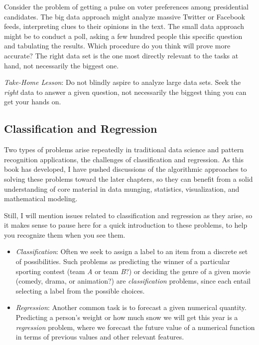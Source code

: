 \documentclass[10pt]{article}
\begin{document}
Consider the problem of getting a pulse on voter preferences among presidential candidates. The big data approach might analyze massive Twitter or Facebook feeds, interpreting clues to their opinions in the text. The small data approach might be to conduct a poll, asking a few hundred people this specific question and tabulating the results. Which procedure do you think will prove more accurate? The right data set is the one most directly relevant to the tasks at hand, not necessarily the biggest one.

\textit{Take-Home Lesson}: Do not blindly aspire to analyze large data sets. Seek the \textit{right} data to answer a given question, not necessarily the biggest thing you can get your hands on.

\subsection{Classification and Regression}
Two types of problems arise repeatedly in traditional data science and pattern recognition applications, the challenges of classification and regression. As this book has developed, I have pushed discussions of the algorithmic approaches to solving these problems toward the later chapters, so they can benefit from a solid understanding of core material in data munging, statistics, visualization, and mathematical modeling.

Still, I will mention issues related to classification and regression as they arise, so it makes sense to pause here for a quick introduction to these problems, to help you recognize them when you see them.

\begin{itemize}
  \item \textit{Classification}: Often we seek to assign a label to an item from a discrete set of possibilities. Such problems as predicting the winner of a particular sporting contest (team \textit{A} or team \textit{B}?) or deciding the genre of a given movie (comedy, drama, or animation?) are \textit{classification} problems, since each entail selecting a label from the possible choices.
  \item \textit{Regression}: Another common task is to forecast a given numerical quantity. Predicting a person's weight or how much snow we will get this year is a \textit{regression} problem, where we forecast the future value of a numerical function in terms of previous values and other relevant features.
\end{itemize}
\end{document}
